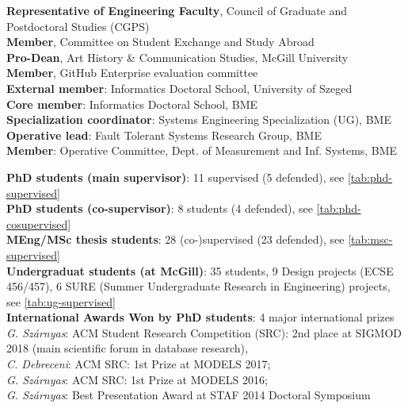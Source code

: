 \documentclass{xetexCV}
\begin{document}
\textbf{Representative of Engineering Faculty},  Council of Graduate and Postdoctoral Studies (CGPS) \\
\textbf{Member}, Committee on Student Exchange and Study Abroad  \\
\textbf{Pro-Dean},  Art History \& Communication Studies, McGill University \\
\textbf{Member}, GitHub Enterprise evaluation committee \\

\textbf{External member}:  Informatics Doctoral School, University of Szeged  \\
\textbf{Core member}:  Informatics Doctoral School, BME   \\
\textbf{Specialization coordinator}:  Systems Engineering Specialization (UG), BME   \\
\textbf{Operative lead}:  Fault Tolerant Systems Research Group, BME   \\
\textbf{Member}:  Operative Committee, Dept. of Measurement and Inf. Systems, BME   \\


\textbf{PhD students (main supervisor)}: 11 supervised (5 defended), see \autoref{tab:phd-supervised} \\
\textbf{PhD students (co-supervisor)}: 8 students (4 defended), see \autoref{tab:phd-cosupervised} \\
\textbf{MEng/MSc thesis students}: 28 (co-)supervised (23 defended), see \autoref{tab:msc-supervised} \\
\textbf{Undergraduat students (at McGill)}: 35 students, 9 Design projects (ECSE 456/457), 6 SURE (Summer Undergraduate Research in Engineering) projects, see \autoref{tab:ug-supervised} \\

\textbf{International Awards Won by PhD students}: 4 major international prizes \\
\emph{G. Sz\'arnyas}: ACM Student Research Competition (SRC): 2nd place at SIGMOD 2018 (main scientific forum in database research), \\
\emph{C. Debreceni}: ACM SRC: 1st Prize at MODELS 2017;\\
\emph{G. Sz\'arnyas}: ACM SRC: 1st Prize at MODELS 2016; \\
\emph{G. Sz\'arnyas}: Best Presentation Award at STAF 2014 Doctoral Symposium \\
\end{document}
